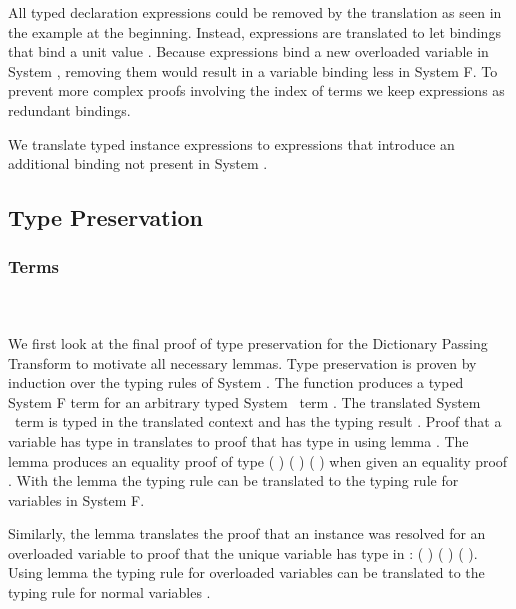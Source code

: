 \noindent All typed declaration expressions  could be removed by the translation as seen in the example at the beginning. 
Instead,  expressions are translated to let bindings that bind a unit value .
Because  expressions bind a new overloaded variable in System \Fo, removing them would result in a variable binding less in System F. To prevent more complex proofs involving the index  of terms we keep  expressions as redundant  bindings. 

\noindent We translate typed instance expressions  to  expressions that introduce an additional binding not present in System \Fo.

\newpage

\subsection{Type Preservation}
\subsubsection{Terms}\hfill\\\\
We first look at the final proof of type preservation for the Dictionary Passing Transform to motivate all necessary lemmas. 
Type preservation is proven by induction over the typing rules of System \Fo. 
The function  produces a typed System F term for an arbitrary typed System \Fo\ term . 
The translated System \Fo\ term   is typed in the translated context   and has the typing result  .
\DPTTermPres
Proof  that a variable  has type  in  translates to proof that   has type   in   using lemma . 
The lemma produces an equality proof of type  ( ) ( )  ( ) when given an equality proof      .
With the lemma  the typing rule  can be translated to the typing rule for variables in System F. 

\noindent Similarly, the lemma  translates the proof  that an instance  \Constr{:}  was resolved for an overloaded variable  to proof that the unique variable   has type   in  :  ( ) ( )  ( ).  
Using lemma  the typing rule for overloaded variables  can be translated to the typing rule for normal variables .

